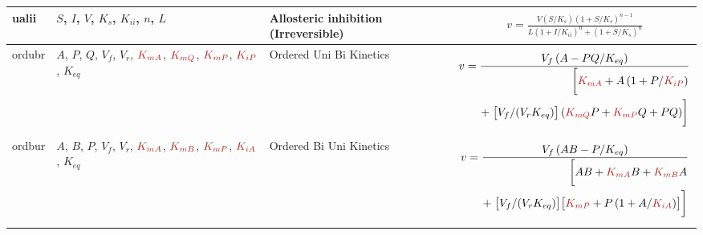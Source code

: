 \documentclass[10pt]{cekarticle}
\newcommand{\changed}[1]{\textcolor{BrickRed}{#1}}
\newenvironment{blockChanged}{\color{BrickRed}}{}
\begin{document}
\begin{table}[ht]
\begin{tabular}{|p{0.45in}|>{\raggedright}m{0.77in}|>{\raggedright}m{1.05in}|m{3.5in}|}
ualii & $S$, $I$, $V$, $K_s$, $K_{ii}$, $n$, $L$ & Allosteric inhibition
(Irreversible) &
\begin{blockChanged}
\begin{gather*}
v = \frac{V \left(S/K_s\right) \left( 1 + S/K_s\right)^{n-1}}{L \left(
1 + I/K_{ii}\right)^n + \left( 1 + S/K_s \right)^n}
\end{gather*}
\end{blockChanged}
\\ \hline

ordubr & $A$, $P$, $Q$, $V_f$, $V_r$, $\changed{K_{mA}}$, $\changed{K_{mQ}}$, $\changed{K_{mP}}$, $\changed{K_{iP}}$,
$K_{eq}$ & Ordered Uni Bi Kinetics &
\begin{blockChanged}
\begin{gather*}
v = \frac{V_f \left( A - P Q/K_{eq}\right)}{\begin{split}
\biggl[ \changed{K_{mA}} + A \left( 1 + P/\changed{K_{iP}}\right) \\
+\; \bigl[ V_f/(V_r K_{eq}) \bigr]
\left( \changed{K_{mQ}} P + \changed{K_{mP}} Q + P Q\right) \biggr]
\end{split}}
\end{gather*}
\end{blockChanged}
\\ \hline

ordbur & $A$, $B$, $P$, $V_f$, $V_r$, $\changed{K_{mA}}$, \changed{$\changed{K_{mB}}$}, $\changed{K_{mP}}$, $\changed{K_{iA}}$,
$K_{eq}$ & Ordered Bi Uni Kinetics &
\begin{blockChanged}
\begin{gather*}
v = \frac{V_f \left( A B -
P/K_{eq}\right)}{\begin{split}
\biggl[ A B + \changed{K_{mA}} B + \changed{\changed{K_{mB}}} A \\
+\; \bigl[ V_f/(V_r K_{eq}) \bigr] \bigl[ \changed{K_{mP}} + P
\left( 1 + A/\changed{K_{iA}}\right) \bigr] \biggr]
\end{split}}
\end{gather*}
\end{blockChanged}
\\ \hline


\end{tabular}
\end{table}
\end{document}

